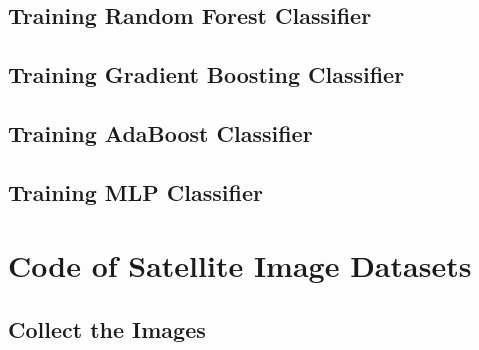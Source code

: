\documentclass[twocolumn]{extarticle}
\begin{document}
\begin{appendices}
\subsection{Training Random Forest Classifier}
\subsection{Training Gradient Boosting Classifier}
\subsection{Training AdaBoost Classifier}
\subsection{Training MLP Classifier}
\section{Code of Satellite Image Datasets}
\subsection{Collect the Images}
\end{appendices}
\end{document}
